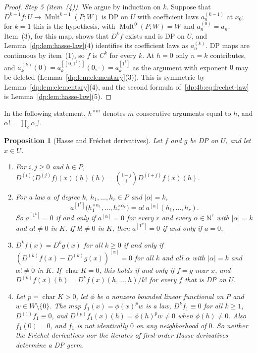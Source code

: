 \documentclass[11pt]{amsart}
\newtheorem{proposition}[theorem]{Proposition}
\theoremstyle{definition}
\theoremstyle{remark}
\numberwithin{equation}{section}
\newcommand{\N}{\mathbb N}
\newcommand{\Mult}{\operatorname{Mult}}
\newcommand{\abs}[1]{\lvert #1\rvert}
\theoremstyle{plain}
\theoremstyle{definition}
\theoremstyle{plain}
\begin{document}
\begin{proof}
\emph{Step 5 (item~(4)).} We argue by induction on $k$. Suppose that $D^{k-1}f\colon U\to\Mult^{k-1}(P;W)$ is DP on $U$ with coefficient laws $a_n^{(k-1)}$ at $x_0$; for $k=1$ this is the hypothesis, with $\Mult^0(P;W)=W$ and $a_n^{(0)}=a_n$. Item~(3), for this map, shows that $D^kf$ exists and is DP on $U$, and Lemma~\ref{dp:lem:hasse-law}(4) identifies its coefficient laws as $a_n^{(k)}$. DP maps are continuous by item~(1), so $f$ is $C^k$ for every $k$. At $h=0$ only $n=k$ contributes, and $a_k^{(k)}(0)=a_k^{[(0,1^k)]}(0,\cdot)=a_k^{[1^k]}$ as the argument with exponent $0$ may be deleted (Lemma~\ref{dp:lem:elementary}(3)). This is symmetric by Lemma~\ref{dp:lem:elementary}(4), and the second formula of~\eqref{dp:4b:eq:frechet-law} is Lemma~\ref{dp:lem:hasse-law}(5).
\end{proof}

In the following statement, $h^{\times m}$ denotes $m$ consecutive arguments equal to $h$, and $\alpha!=\prod_c\alpha_c!$.

\begin{proposition}[Hasse and Fr\'echet derivatives]\label{dp:prop:frechet-hasse}
Let $f$ and $g$ be DP on $U$, and let $x\in U$.
\begin{enumerate}
\item For $i,j\ge0$ and $h\in P$, $D^{(i)}\bigl(D^{(j)}f\bigr)(x)(h)(h)=\binom{i+j}iD^{(i+j)}f(x)(h)$.
\item For a law $a$ of degree $k$, $h_1,\dots,h_r\in P$ and $\abs\alpha=k$,
\begin{equation}\label{dp:4b:eq:full-polarization}
 a^{[1^k]}\bigl(h_1^{\times\alpha_1},\dots,h_r^{\times\alpha_r}\bigr)=\alpha!\,a^{[\alpha]}(h_1,\dots,h_r).
\end{equation}
So $a^{[1^k]}=0$ if and only if $a^{[\alpha]}=0$ for every $r$ and every $\alpha\in\N^r$ with $\abs\alpha=k$ and $\alpha!\ne0$ in $K$. If $k!\ne0$ in $K$, then $a^{[1^k]}=0$ if and only if $a=0$.
\item $D^kf(x)=D^kg(x)$ for all $k\ge0$ if and only if $(D^{(k)}f(x)-D^{(k)}g(x))^{[\alpha]}=0$ for all $k$ and all $\alpha$ with $\abs\alpha=k$ and $\alpha!\ne0$ in $K$. If $\operatorname{char}K=0$, this holds if and only if $f=g$ near $x$, and $D^{(k)}f(x)(h)=D^kf(x)(h,\dots,h)/k!$ for every $f$ that is DP on $U$.
\item Let $p=\operatorname{char}K>0$, let $\phi$ be a nonzero bounded linear functional on $P$ and $w\in W\setminus\{0\}$. The map $f_1(x)=\phi(x)^pw$ is a law, $D^kf_1\equiv0$ for all $k\ge1$, $D^{(1)}f_1\equiv0$, and $D^{(p)}f_1(x)(h)=\phi(h)^pw\ne0$ when $\phi(h)\ne0$. Also $f_1(0)=0$, and $f_1$ is not identically $0$ on any neighborhood of $0$. So neither the Fr\'echet derivatives nor the iterates of first-order Hasse derivatives determine a DP germ.
\end{enumerate}
\end{proposition}
\end{document}
